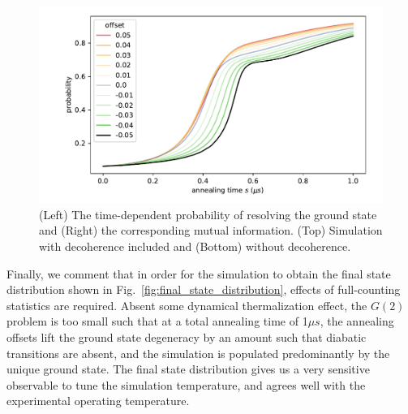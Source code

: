 \documentclass[prd,twocolumn,tightenlines,preprintnumbers,showpacs,superscriptaddress,notitlepage,nofootinbib,eqsecnum,floatfix,longbibliography,aps,10pt]{revtex4-2}
\begin{document}
\begin{figure}
	\centering
	\includegraphics[width=\columnwidth]{./new_figures/time_dependent_probability.pdf}
	\caption{(Left) The time-dependent probability of resolving the ground state and (Right) the corresponding mutual information. (Top) Simulation with decoherence included and (Bottom) without decoherence.}
	\label{fig:td_prob}
\end{figure}

Finally, we comment that in order for the simulation to obtain the final state distribution shown in Fig.~\ref{fig:final_state_distribution}, effects of full-counting statistics are required.
Absent some dynamical thermalization effect, the $G(2)$ problem is too small such that at a total annealing time of 1$\mu s$, the annealing offsets lift the ground state degeneracy by an amount such that diabatic transitions are absent, and the simulation is populated predominantly by the unique ground state.
The final state distribution gives us a very sensitive observable to tune the simulation temperature, and agrees well with the experimental operating temperature.


\end{document}

